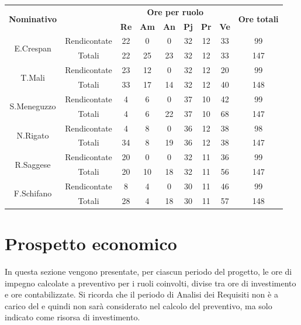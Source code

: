 \begin{center}
	\begin{tabular}{|c|c|c|c|c|c|c|c|c|}
		\hline
		\multirow{2}{*}{\textbf{Nominativo}} & & \multicolumn{6}{c|}{\textbf{Ore per ruolo}} & \multirow{2}{*}{\textbf{Ore totali}} \\
		& & \textbf{Re} & \textbf{Am} & \textbf{An} & \textbf{Pj} & \textbf{Pr} & \textbf{Ve} & \\
		\hline
		\hline
		\multirow{2}{*}{E.Crespan}		&	Rendicontate	&	22	&	0	&	0	&	32	&	12	& 33 	&	99	\\
		\cline{2-9}
		&	Totali			&	22	&	25	&	23	&	32	&	12	& 	33	&	147	\\
		\hline
		\hline
		\multirow{2}{*}{T.Mali}	&	Rendicontate	&	23	&	12	&	0	&	32	&	12	&  20	&	99	\\
		\cline{2-9}
		&	Totali			&	33	&	17	&	14	&	32	&	12	& 	40	&	148	\\
		\hline
		\hline
		\multirow{2}{*}{S.Meneguzzo}	&	Rendicontate	&	4	&	6	&	0	&	37	&	10	&	42	&	99	\\
		\cline{2-9}
		&	Totali			&	4	&	6	&	22	&	37	&	10	&	68	&	147	\\
		\hline
		\hline
		\multirow{2}{*}{N.Rigato}	&	Rendicontate	&	4	&	8	&	0	&	36	&	12	&	38	&	98	\\
		\cline{2-9}
		&	Totali			&	34	&	8	&	19	&	36	&	12	&	38	&	147	\\
		\hline
		\hline
		\multirow{2}{*}{R.Saggese}		&	Rendicontate	&	20	&	0	&	0	&	32	&	11	& 	36	&	99	\\
		\cline{2-9}
		&	Totali			&	20	&	10	&	18	&	32	&	11	& 	56	&	147	\\
		\hline
		\hline
		\multirow{2}{*}{F.Schifano}	&	Rendicontate	&	8	&	4	&	0	&	30	&	11	& 	46	&	99	\\
		\cline{2-9}
		&	Totali			&	28	&	4	&	18	&	30	&	11	& 	57	&	148	\\
		\hline
		
	\end{tabular}
\end{center}

\section{Prospetto economico}
In questa sezione vengono presentate, per ciascun periodo del progetto, le ore di impegno calcolate
a preventivo per i ruoli coinvolti, divise tra ore di investimento e ore contabilizzate. Si ricorda che
il periodo di Analisi dei Requisiti non è a carico del  e quindi non sarà considerato
nel calcolo del preventivo, ma solo indicato come risorsa di investimento.

